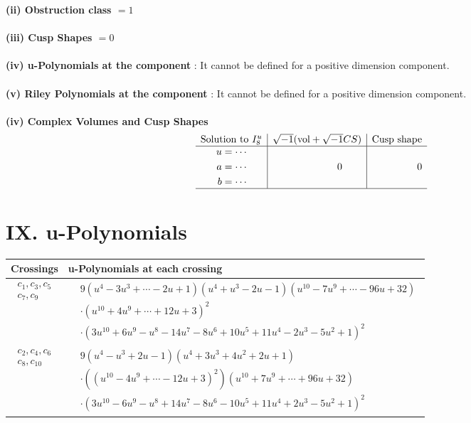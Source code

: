 \documentclass[1p]{elsarticle_modified}
\theoremstyle{definition}
\newcommand{\I}{\sqrt{-1}}
\begin{document}
\flushleft \textbf{(ii) Obstruction class $= 1$}\\~\\
\flushleft \textbf{(iii) Cusp Shapes $= 0$}\\~\\
\flushleft \textbf{(iv) u-Polynomials at the component} : It cannot be defined for a positive dimension component.\\~\\
\flushleft \textbf{(v) Riley Polynomials at the component} : It cannot be defined for a positive dimension component.\\~\\
\newpage\flushleft \textbf{(iv) Complex Volumes and Cusp Shapes}
$$\begin{array}{c|c|c} 
\text{Solution to }I^u_{8}& \I (\text{vol} + \sqrt{-1}CS) & \text{Cusp shape}\\
 \hline 
\begin{aligned}
u &= \cdots \\
a &= \cdots \\
b &= \cdots\end{aligned}
 & \phantom{-0.000000 } 0 & \phantom{-0.000000 } 0\\
 \hline 
 \end{array}
$$
\newpage\renewcommand{\arraystretch}{1}
\centering \section*{ IX. u-Polynomials}
\begin{tabular}{m{50pt}|m{274pt}}
Crossings & \hspace{64pt}u-Polynomials at each crossing \\
\hline $$\begin{aligned}c_{1},c_{3},c_{5}\\c_{7},c_{9}\end{aligned}$$&$\begin{aligned}
&9(u^{4}-3 u^{3}+\cdots-2 u+1)(u^4+u^3-2 u-1)(u^{10}-7 u^{9}+\cdots-96 u+32)\\
&\cdot(u^{10}+4 u^9+\cdots+12 u+3)^{2}\\
&\cdot(3 u^{10}+6 u^9- u^8-14 u^7-8 u^6+10 u^5+11 u^4-2 u^3-5 u^2+1)^2
\end{aligned}$\\
\hline $$\begin{aligned}c_{2},c_{4},c_{6}\\c_{8},c_{10}\end{aligned}$$&$\begin{aligned}
&9(u^4- u^3+2 u-1)(u^4+3 u^3+4 u^2+2 u+1)\\
&\cdot((u^{10}-4 u^9+\cdots-12 u+3)^{2})(u^{10}+7 u^9+\cdots+96 u+32)\\
&\cdot(3 u^{10}-6 u^9- u^8+14 u^7-8 u^6-10 u^5+11 u^4+2 u^3-5 u^2+1)^2
\end{aligned}$\\
\hline
\end{tabular}\newpage\renewcommand{\arraystretch}{1}
\end{document}
